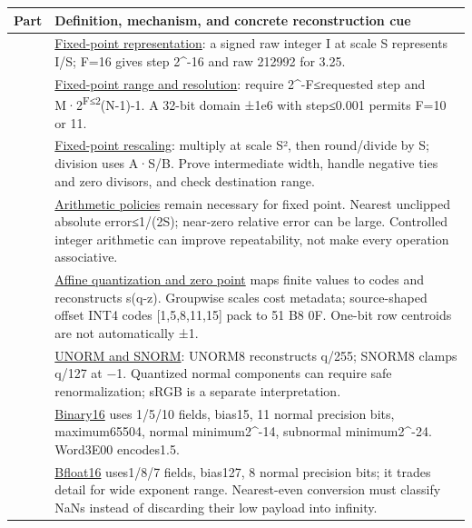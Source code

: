 {\def\LTcaptype{none} %
\begin{longtable}[]{@{}
  >{\raggedright\arraybackslash}p{}
  >{\raggedright\arraybackslash}p{}@{}}
\toprule\noalign{}
\begin{minipage}[b]{\linewidth}\raggedright
Part
\end{minipage} & \begin{minipage}[b]{\linewidth}\raggedright
Definition, mechanism, and concrete reconstruction cue
\end{minipage} \\
\midrule\noalign{}
\endhead
\bottomrule\noalign{}
\endlastfoot
89 & \hyperref[appendix-1d0dbe8924cc]{Fixed-point representation}: a signed raw integer I at scale S represents I/S; F=16 gives step 2\^{}-16 and raw 212992 for 3.25. \\
90 & \hyperref[appendix-ceb4c4a9b5a1]{Fixed-point range and resolution}: require 2\^{}-F≤requested step and M·2\textsuperscript{F≤2}(N-1)-1. A 32-bit domain ±1e6 with step≤0.001 permits F=10 or 11. \\
91 & \hyperref[appendix-3333db47830f]{Fixed-point rescaling}: multiply at scale S², then round/divide by S; division uses A·S/B. Prove intermediate width, handle negative ties and zero divisors, and check destination range. \\
92 & \hyperref[appendix-2ed044358b82]{Arithmetic policies} remain necessary for fixed point. Nearest unclipped absolute error≤1/(2S); near-zero relative error can be large. Controlled integer arithmetic can improve repeatability, not make every operation associative. \\
93 & \hyperref[appendix-d5da3eaabaef]{Affine quantization and zero point} maps finite values to codes and reconstructs s(q-z). Groupwise scales cost metadata; source-shaped offset INT4 codes {[}1,5,8,11,15{]} pack to 51 B8 0F. One-bit row centroids are not automatically ±1. \\
94 & \hyperref[appendix-b2402c453dac]{UNORM and SNORM}: UNORM8 reconstructs q/255; SNORM8 clamps q/127 at −1. Quantized normal components can require safe renormalization; sRGB is a separate interpretation. \\
95 & \hyperref[appendix-34443cec7170]{Binary16} uses 1/5/10 fields, bias15, 11 normal precision bits, maximum65504, normal minimum2\^{}-14, subnormal minimum2\^{}-24. Word3E00 encodes1.5. \\
96 & \hyperref[appendix-18b8dd966b5d]{Bfloat16} uses1/8/7 fields, bias127, 8 normal precision bits; it trades detail for wide exponent range. Nearest-even conversion must classify NaNs instead of discarding their low payload into infinity. \\

\end{longtable}}
